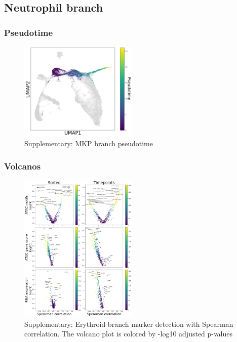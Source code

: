 \documentclass[a4paper]{article}
\begin{document}
\FloatBarrier
\subsection{Neutrophil branch}

\subsubsection{Pseudotime}
\begin{figure}[!htb]
  \centering
  \includegraphics[width=0.5\textwidth]{../figures/hematopoiesis/Neutrophil_40_106_single_branch_pseudotime.png}
  \caption{Supplementary: MKP branch pseudotime}
\end{figure}

\FloatBarrier
\subsubsection{Volcanos}

\begin{figure}[!htb]
  \centering
  \includegraphics[width=0.5\textwidth]{../figures/hematopoiesis/Neutrophil_40_106_smooth_none_single_branch_volcanos_motifs.png}
  \caption{Supplementary: Erythroid branch marker detection with Spearman correlation. The volcano plot is colored by -log10 adjusted p-values}
\end{figure}
\end{document}
